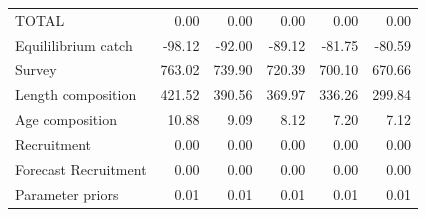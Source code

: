 \documentclass[12pt,]{article}
\begin{document}
\begin{landscape}
\begin{table}[ht]
{\begin{tabular}{lrrrrr}
  TOTAL & 0.00 & 0.00 & 0.00 & 0.00 & 0.00 \\ 
  Equililibrium catch & -98.12 & -92.00 & -89.12 & -81.75 & -80.59 \\ 
  Survey & 763.02 & 739.90 & 720.39 & 700.10 & 670.66 \\ 
  Length composition & 421.52 & 390.56 & 369.97 & 336.26 & 299.84 \\ 
  Age composition & 10.88 & 9.09 & 8.12 & 7.20 & 7.12 \\ 
  Recruitment & 0.00 & 0.00 & 0.00 & 0.00 & 0.00 \\ 
  Forecast Recruitment & 0.00 & 0.00 & 0.00 & 0.00 & 0.00 \\ 
  Parameter priors & 0.01 & 0.01 & 0.01 & 0.01 & 0.01 \\ 
   \hline
\end{tabular}
}
\end{table}
\end{landscape}

\newpage
\end{document}
